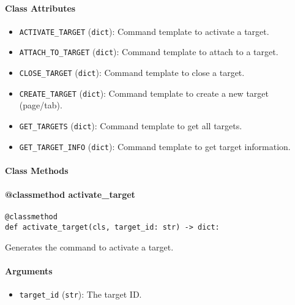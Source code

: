 \documentclass{article}
\begin{document}
\paragraph{Class Attributes}

\begin{itemize}
    \item \lstinline[style=pythonstyle]|ACTIVATE_TARGET| (\lstinline[style=pythonstyle]|dict|): Command template to activate a target.
    \item \lstinline[style=pythonstyle]|ATTACH_TO_TARGET| (\lstinline[style=pythonstyle]|dict|): Command template to attach to a target.
    \item \lstinline[style=pythonstyle]|CLOSE_TARGET| (\lstinline[style=pythonstyle]|dict|): Command template to close a target.
    \item \lstinline[style=pythonstyle]|CREATE_TARGET| (\lstinline[style=pythonstyle]|dict|): Command template to create a new target (page/tab).
    \item \lstinline[style=pythonstyle]|GET_TARGETS| (\lstinline[style=pythonstyle]|dict|): Command template to get all targets.
    \item \lstinline[style=pythonstyle]|GET_TARGET_INFO| (\lstinline[style=pythonstyle]|dict|): Command template to get target information.
\end{itemize}

\paragraph{Class Methods}
\paragraph{@classmethod activate\_target}

\begin{lstlisting}[style=pythonstyle]
@classmethod
def activate_target(cls, target_id: str) -> dict:
\end{lstlisting}

\noindent Generates the command to activate a target.

\paragraph{Arguments}

\begin{itemize}
    \item \lstinline[style=pythonstyle]|target_id| (\lstinline[style=pythonstyle]|str|): The target ID.
\end{itemize}
\end{document}
